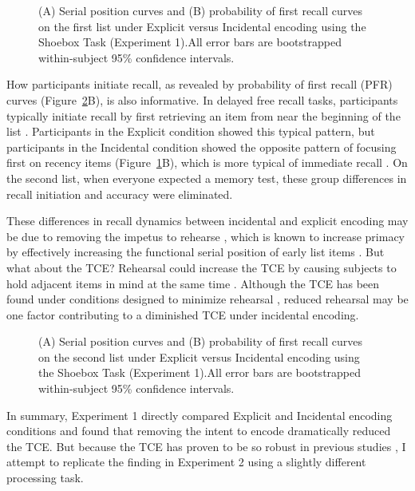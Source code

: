 \documentclass[man,natbib,floatsintext]{apa6} %
\begin{document}
\newcommand\spcpaneltext{All error bars are bootstrapped within-subject 95\% confidence intervals.}
\begin{figure}
\caption{(A) Serial position curves and (B) probability of first recall curves on the first list under Explicit versus Incidental encoding using the Shoebox Task (Experiment 1).\spcpaneltext}
\label{e1_l1_spc}
\end{figure}

How participants initiate recall, as revealed by probability of first recall (PFR) curves (Figure~\ref{e1_l2_spc}B), is also informative. In delayed free recall tasks, participants typically initiate recall by first retrieving an item from near the beginning of the list \citep[i.e., they focus first on primacy items;][]{HowaKaha99}. Participants in the Explicit condition showed this typical pattern, but participants in the Incidental condition showed the opposite pattern of focusing first on recency items (Figure~\ref{e1_l1_spc}B), which is more typical of immediate recall \citep{Hoga75}. On the second list, when everyone expected a memory test, these group differences in recall initiation and accuracy were eliminated.

These differences in recall dynamics between incidental and explicit encoding may be due to removing the impetus to rehearse \citep{MarsWerd72,Neat93,GlenEtal80}, which is known to increase primacy by effectively increasing the  functional serial position of early list items \citep{Rund71,BrodMurd77,TanWard00}. But what about the TCE? Rehearsal could increase the TCE by causing subjects to hold adjacent items in mind at the same time \citep{Hint16}. Although the TCE has been found under conditions designed to minimize rehearsal \citep{HowaKaha99}, reduced rehearsal may be one factor contributing to a diminished TCE under incidental encoding.

\begin{figure}
\caption{(A) Serial position curves and (B) probability of first recall curves on the second list under Explicit versus Incidental encoding using the Shoebox Task (Experiment 1).\spcpaneltext}
\label{e1_l2_spc}
\end{figure}

In summary, Experiment 1 directly compared Explicit and Incidental encoding conditions and found that removing the intent to encode dramatically reduced the TCE. \color{black} But because the TCE has proven to be so robust in previous studies \citep{HealKaha17}, I attempt to replicate the finding in Experiment 2 using a slightly different processing task.
\end{document}
